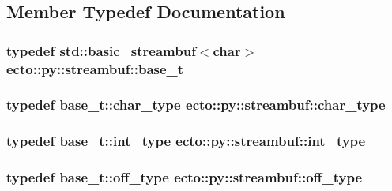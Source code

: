 \subsection{\-Member \-Typedef \-Documentation}
\hypertarget{classecto_1_1py_1_1streambuf_ac46c69e7d213fec69f80d1943389366c}{
\subsubsection[{base\-\_\-t}]{\setlength{\rightskip}{0pt plus 5cm}typedef std\-::basic\-\_\-streambuf$<$char$>$ {\bf ecto\-::py\-::streambuf\-::base\-\_\-t}}}\label{classecto_1_1py_1_1streambuf_ac46c69e7d213fec69f80d1943389366c}
\hypertarget{classecto_1_1py_1_1streambuf_acd255be6a50678c600c431c5bea7bc7b}{
\subsubsection[{char\-\_\-type}]{\setlength{\rightskip}{0pt plus 5cm}typedef base\-\_\-t\-::char\-\_\-type {\bf ecto\-::py\-::streambuf\-::char\-\_\-type}}}\label{classecto_1_1py_1_1streambuf_acd255be6a50678c600c431c5bea7bc7b}
\hypertarget{classecto_1_1py_1_1streambuf_a1bfd3d3f54b7b91a5ea54f980436a617}{
\subsubsection[{int\-\_\-type}]{\setlength{\rightskip}{0pt plus 5cm}typedef base\-\_\-t\-::int\-\_\-type {\bf ecto\-::py\-::streambuf\-::int\-\_\-type}}}\label{classecto_1_1py_1_1streambuf_a1bfd3d3f54b7b91a5ea54f980436a617}
\hypertarget{classecto_1_1py_1_1streambuf_aa01772d1599fc51089a209a69fcab7c7}{
\subsubsection[{off\-\_\-type}]{\setlength{\rightskip}{0pt plus 5cm}typedef base\-\_\-t\-::off\-\_\-type {\bf ecto\-::py\-::streambuf\-::off\-\_\-type}}}\label{classecto_1_1py_1_1streambuf_aa01772d1599fc51089a209a69fcab7c7}
